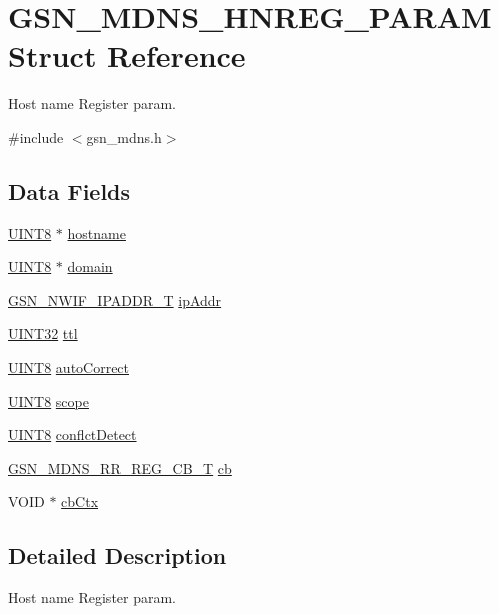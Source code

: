 \hypertarget{a00143}{
\section{GSN\_\-MDNS\_\-HNREG\_\-PARAM Struct Reference}
\label{a00143}
}


Host name Register param.  




{\ttfamily \#include $<$gsn\_\-mdns.h$>$}

\subsection*{Data Fields}
\begin{DoxyCompactItemize}
\item 
\hyperlink{a00660_gab27e9918b538ce9d8ca692479b375b6a}{UINT8} $\ast$ \hyperlink{a00143_a45121663692c76af31d59c96115adbd1}{hostname}
\item 
\hyperlink{a00660_gab27e9918b538ce9d8ca692479b375b6a}{UINT8} $\ast$ \hyperlink{a00143_a3498b70cb998dd924ec4aea5780b9696}{domain}
\item 
\hyperlink{a00173}{GSN\_\-NWIF\_\-IPADDR\_\-T} \hyperlink{a00143_abff310b1595daac16cd3f35c9c6e95eb}{ipAddr}
\item 
\hyperlink{a00660_gae1e6edbbc26d6fbc71a90190d0266018}{UINT32} \hyperlink{a00143_af96204bb13dce2fe8a0dac78b29c40a4}{ttl}
\item 
\hyperlink{a00660_gab27e9918b538ce9d8ca692479b375b6a}{UINT8} \hyperlink{a00143_a6922e2bbd8ef32a53abd5bbf5e2b40a1}{autoCorrect}
\item 
\hyperlink{a00660_gab27e9918b538ce9d8ca692479b375b6a}{UINT8} \hyperlink{a00143_aa73cc4a6cdd8178cc27ecbdd515c750c}{scope}
\item 
\hyperlink{a00660_gab27e9918b538ce9d8ca692479b375b6a}{UINT8} \hyperlink{a00143_af923e50a1240af46d2dedbe9789fb582}{conflctDetect}
\item 
\hyperlink{a00668_ga9c52fae5548745f14ef4e76fb05c2526}{GSN\_\-MDNS\_\-RR\_\-REG\_\-CB\_\-T} \hyperlink{a00143_a9537e3f5198ad7dff4aeecabdc552166}{cb}
\item 
VOID $\ast$ \hyperlink{a00143_abc1717c5357c7dda5c2abef096a06f1f}{cbCtx}
\end{DoxyCompactItemize}


\subsection{Detailed Description}
Host name Register param. 

